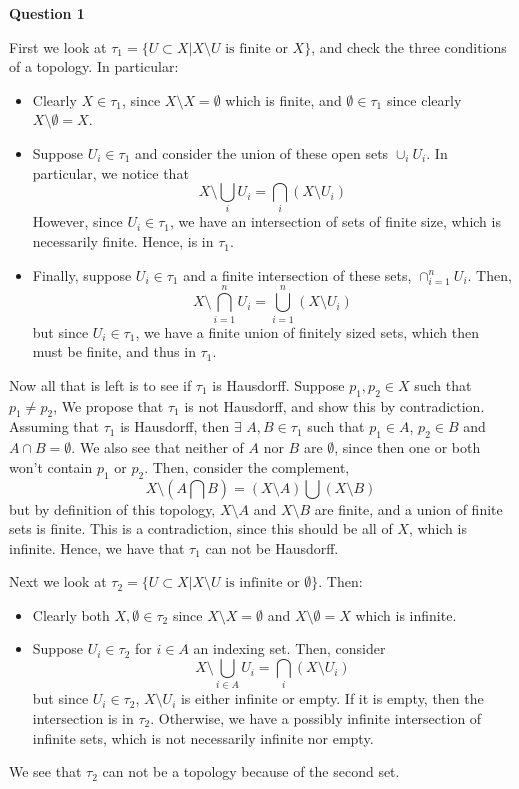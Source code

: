 \documentclass[10pt]{article}
\begin{document}
\textbf{Question 1}

First we look at $\tau_{1} = \{U\subset X | X \setminus U \text{ is finite or } X\}$, and check the three conditions of a topology. In particular:
\begin{itemize}
\item Clearly $X \in \tau_{1}$, since $X \setminus X = \emptyset$ which is finite, and $\emptyset \in \tau_{1}$ since clearly $X \setminus \emptyset = X$.
\item Suppose $U_{i}\in \tau_{1}$ and consider the union of these open sets $\cup_{i}U_{i}$. In particular, we notice that
  $$X \setminus \bigcup_{i}U_{i} = \bigcap_{i}\left(X\setminus U_{i}\right)$$
  However, since $U_{i}\in \tau_{1}$, we have an intersection of sets of finite size, which is necessarily finite. Hence, is in $\tau_{1}$.
\item Finally, suppose $U_{i}\in \tau_{1}$ and a finite intersection of these sets, $\cap_{i=1}^{n}U_{i}$. Then,
  $$X\setminus \bigcap_{i=1}^{n}U_{i} = \bigcup_{i=1}^{n}\left(X\setminus U_{i}\right)$$
  but since $U_{i}\in \tau_{1}$, we have a finite union of finitely sized sets, which then must be finite, and thus in $\tau_{1}$.
\end{itemize}
Now all that is left is to see if $\tau_{1}$ is Hausdorff. Suppose $p_{1},p_{2}\in X$ such that $p_{1} \neq p_{2}$, We propose that $\tau_{1}$ is not Hausdorff, and show this by contradiction. Assuming that $\tau_{1}$ is Hausdorff, then $\exists$ $A,B \in \tau_{1}$ such that $p_{1}\in A$, $p_{2}\in B$ and $A \cap B = \emptyset$. We also see that neither of $A$ nor $B$ are $\emptyset$, since then one or both won't contain $p_{1}$ or $p_{2}$. Then, consider the complement,
$$X\setminus \left(A \bigcap B \right) = \left(X\setminus A\right) \bigcup \left(X \setminus B\right)$$
but by definition of this topology, $X\setminus A$ and $X\setminus B$ are finite, and a union of finite sets is finite. This is a contradiction, since this should be all of $X$, which is infinite. Hence, we have that $\tau_{1}$ can not be Hausdorff.

Next we look at $\tau_{2} = \{ U \subset X | X\setminus U \text{ is infinite or } \emptyset \}$. Then:
\begin{itemize}
\item Clearly both $X,\emptyset \in \tau_{2}$ since $X\setminus X = \emptyset$ and $X \setminus \emptyset = X$ which is infinite.
\item Suppose $U_{i}\in \tau_{2}$ for $i\in A$ an indexing set. Then, consider 
  $$X \setminus \bigcup_{i\in A} U_{i} = \bigcap_{i}\left(X\setminus U_{i}\right)$$
  but since $U_{i}\in \tau_{2}$, $X\setminus U_{i}$ is either infinite or empty. If it is empty, then the intersection is in $\tau_{2}$. Otherwise, we have a possibly infinite intersection of infinite sets, which is not necessarily infinite nor empty.
\end{itemize}
We see that $\tau_{2}$ can not be a topology because of the second set.
\end{document}
